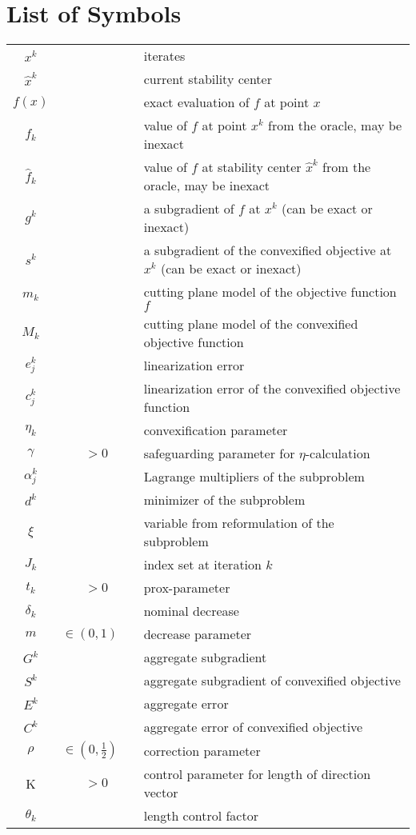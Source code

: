 \section*{List of Symbols}

\thispagestyle{empty}

\begin{tabular}{c@{}c@{} l@{}}
	\(x^k\) && iterates \\
	\(\hat{x}^k\) && current stability center \\
	\(f(x)\) && exact evaluation of \(f\) at point \(x\) \\
	\(f_k\) && value of \(f\) at point \(x^k\) from the oracle, may be inexact \\
	\(\hat{f}_k\) && value of \(f\) at stability center \(\hat{x}^k\) from the oracle, may be inexact \\
	\(g^k\) && a subgradient of \(f\) at \(x^k\) (can be exact or inexact) \\
	\(s^k\) && a subgradient of the convexified objective at \(x^k\) (can be exact or inexact) \\
	\(m_k\) && cutting plane model of the objective function \(f\) \\
	\(M_k\) && cutting plane model of the convexified objective function \\
	\(e_j^k\) && linearization error \\
	\(c_j^k\) && linearization error of the convexified objective function \\
	\(\eta_k\) && convexification parameter \\
	\(\gamma\) & \(>0\) & safeguarding parameter for \(\eta\)-calculation \\
  \(\alpha_j^k\) && Lagrange multipliers of the subproblem \\
	\(d^k\) && minimizer of the subproblem \\
	\(\xi\) && variable from reformulation of the subproblem \\
	\(J_k\) && index set at iteration \(k\) \\
	\(t_k\) &\(>0\)& prox-parameter \\
	\(\delta_k\) && nominal decrease \\
	\(m\) &\(\in (0,1) \quad\)& decrease parameter \\
	\(G^k\) && aggregate subgradient \\
	\(S^k\) && aggregate subgradient of convexified objective \\
	\(E^k\) && aggregate error \\
	\(C^k\)	&& aggregate error of convexified objective \\
	\(\rho\) & \(\in (0,\frac{1}{2}) \quad \) & correction parameter \\
	K & \(>0\) & control parameter for length of direction vector \\ 
	\(\theta_k\) && length control factor
\end{tabular}
